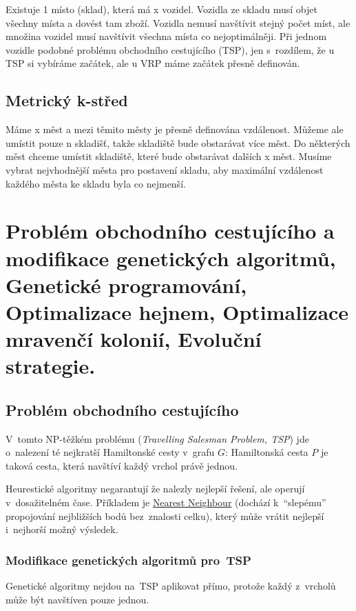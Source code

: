 Existuje 1 místo (sklad), která má x vozidel.
Vozidla ze skladu musí objet všechny místa a dovést tam zboží. 
Vozidla nemusí navštívit stejný počet míst, ale množina vozidel musí navštívit všechna místa co nejoptimálněji. 
Při jednom vozidle podobné problému obchodního cestujícího (TSP), jen s~rozdílem, že u TSP si vybíráme začátek, ale u VRP máme začátek přesně definován.

\subsection{Metrický k-střed}

Máme x měst a mezi těmito městy je přesně definována vzdálenost.
Můžeme ale umístit pouze n skladišť, takže skladiště bude obstarávat více měst. 
Do některých měst chceme umístit skladiště, které bude obstarávat dalších x měst.
Musíme vybrat nejvhodnější města pro postavení skladu, aby maximální vzdálenost každého města ke skladu byla co nejmenší.


\clearpage
\section{Problém obchodního cestujícího a modifikace genetických algoritmů, Genetické programování, Optimalizace hejnem, Optimalizace mravenčí kolonií, Evoluční strategie.}

\subsection{Problém obchodního cestujícího}

V~tomto NP-těžkém problému (\emph{Travelling Salesman Problem, TSP}) jde o~nalezení té nejkratší Hamiltonské cesty v~grafu $G$:
Hamiltonská cesta $P$ je taková cesta, která navštíví každý vrchol právě jednou.

Heurestické algoritmy negarantují že nalezly nejlepší řešení, ale operují v~dosažitelném čase.
Příkladem je \href{https://en.wikipedia.org/wiki/Nearest_neighbour_algorithm}{Nearest Neighbour} (dochází k~\enquote{slepému} propojování nejbližších bodů bez~znalosti celku), který může vrátit nejlepší i~nejhorší možný výsledek.

\subsubsection{Modifikace genetických algoritmů pro~TSP}

Genetické algoritmy nejdou na~TSP aplikovat přímo, protože každý z~vrcholů může být navštíven pouze jednou.

